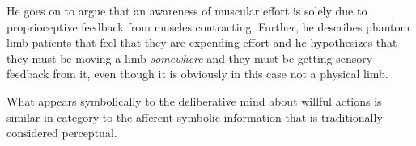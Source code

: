 He goes on to argue that an awareness of muscular effort is solely due
to proprioceptive feedback from muscles contracting.  Further, he
describes phantom limb patients that feel that they are expending
effort and he hypothesizes that they must be moving a limb
\emph{somewhere} and they must be getting sensory feedback from it,
even though it is obviously in this case not a physical limb.

What appears symbolically to the deliberative mind about willful
actions is similar in category to the afferent symbolic information
that is traditionally considered perceptual.







